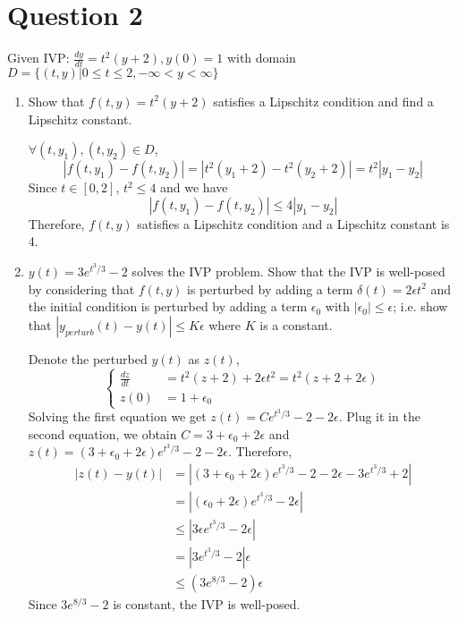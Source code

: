 \documentclass[10pt]{report}
\newcommand{\abs}[1] {\left| #1 \right|}
\begin{document}
\section*{Question 2}
Given IVP: $\frac{dy}{dt} = t^2(y+2), y(0)=1$ with domain $D=\{(t,y) | 0\le t\le 2, -\infty<y<\infty\}$
\begin{enumerate}
	\item
	Show that $f(t,y) = t^2(y+2)$ satisfies a Lipschitz condition and find a Lipschitz constant.
	
	$\forall (t, y_1), (t, y_2) \in D$, 
	\[
	\abs{f(t,y_1) - f(t,y_2)}
	= \abs{t^2(y_1 + 2) - t^2(y_2 + 2)}
	= t^2\abs{y_1 - y_2}
	\]
	Since $t\in [0,2]$, $t^2\le 4$ and we have
	\[
	\abs{f(t,y_1) - f(t,y_2)}
	\le 4\abs{y_1 - y_2}
	\]
	Therefore, $f(t,y)$ satisfies a Lipschitz condition and a Lipschitz constant is 4.
	
	\item
	$y(t)=3e^{t^3/3} - 2$ solves the IVP problem. Show that the IVP is well-posed by considering that $f(t,y)$ is perturbed by adding a term $\delta(t) = 2\epsilon t^2$ and the initial condition is perturbed by adding a term $\epsilon_0$ with $\abs{\epsilon_0}\le\epsilon$; i.e. show that $\abs{y_{perturb}(t) - y(t)}\le K\epsilon$ where $K$ is a constant.
	
	Denote the perturbed $y(t)$ as $z(t)$,
	\[
	\left\{
	\begin{aligned}
	\frac{dz}{dt} &= t^2(z+2) + 2\epsilon t^2 = t^2(z+2+2\epsilon)\\
	z(0) &= 1 + \epsilon_0
	\end{aligned}
	\right.
	\]
	Solving the first equation we get $z(t) = C e^{t^3/3} - 2 -2\epsilon$. Plug it in the second equation, we obtain $C = 3+\epsilon_0+2\epsilon$ and $z(t) = (3+\epsilon_0+2\epsilon)e^{t^3/3} - 2 -2\epsilon$. Therefore,
	\begin{align*}
	\abs{z(t) - y(t)} &= \abs{(3+\epsilon_0+2\epsilon)e^{t^3/3} - 2 -2\epsilon - 3e^{t^3/3} + 2}\\
	&= \abs{(\epsilon_0+2\epsilon)e^{t^3/3} - 2\epsilon}\\
	&\le \abs{3\epsilon e^{t^3/3} - 2\epsilon} \tag{$\abs{\epsilon_0}\le\epsilon$}\\
	&= \abs{3e^{t^3/3}-2} \epsilon \tag{$\epsilon > \abs{\epsilon_0} \ge 0$}\\
	&\le (3e^{8/3} - 2) \epsilon \tag{$t\in [0,2]$}
	\end{align*}
	Since $3e^{8/3} - 2$ is constant, the IVP is well-posed.
	
\end{enumerate}
\end{document}
